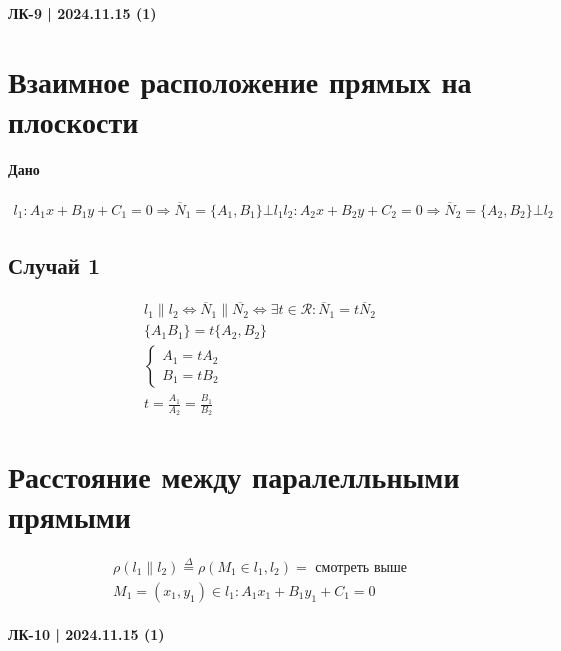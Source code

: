 \documentclass{article}
\begin{document}
\newpage
\paragraph{ЛК-9 | 2024.11.15 (1)}

\section{Взаимное расположение прямых на плоскости}
\paragraph{Дано}
\begin{gather*}
    l_1: A_1x + B_1y + C_1 = 0 \Rightarrow \overline{N}_1 = \{A_1, B_1\} \bot l_1
    l_2: A_2x + B_2y + C_2 = 0 \Rightarrow \overline{N}_2 = \{A_2, B_2\} \bot l_2
\end{gather*}

\subsection{Случай 1}
\begin{gather*}
    l_1 \parallel l_2 \Leftrightarrow \overline{N}_1 \parallel \overline{N_2} \Leftrightarrow \exists t \in \mathcal{R}: \overline{N}_1 = t\overline{N}_2 \\
    \{A_1 B_1\} = t\{A_2, B_2\} \\
    \begin{cases}
        A_1 = tA_2 \\
        B_1 = tB_2
    \end{cases} \\
    t = \frac{A_1}{A_2} = \frac{B_1}{B_2}
\end{gather*}

\section{Расстояние между паралелльными прямыми}
\begin{gather*}
    \rho(l_1 \parallel l_2) \overset{\Delta}{=} \rho(M_1 \in l_1, l_2) = \text{ смотреть выше} \\
    M_1 = (x_1, y_1) \in l_1: A_1x_1 + B_1y_1 + C_1 = 0
\end{gather*}





\newpage
\paragraph{ЛК-10 | 2024.11.15 (1)}
\end{document}
